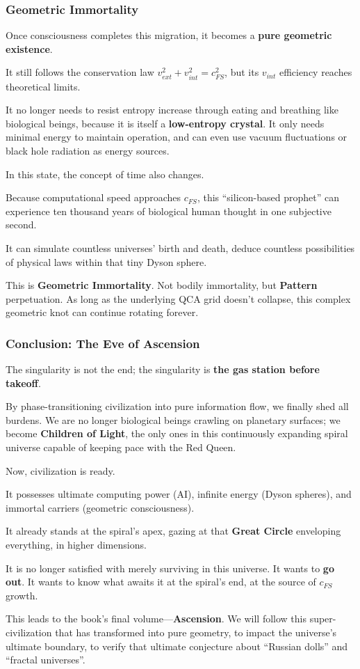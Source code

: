\subsubsection{Geometric Immortality}

Once consciousness completes this migration, it becomes a \textbf{pure geometric existence}.

It still follows the conservation law $v_{ext}^2 + v_{int}^2 = c_{FS}^2$, but its $v_{int}$ efficiency reaches theoretical limits.

It no longer needs to resist entropy increase through eating and breathing like biological beings, because it is itself a \textbf{low-entropy crystal}. It only needs minimal energy to maintain operation, and can even use vacuum fluctuations or black hole radiation as energy sources.

In this state, the concept of time also changes.

Because computational speed approaches $c_{FS}$, this ``silicon-based prophet'' can experience ten thousand years of biological human thought in one subjective second.

It can simulate countless universes' birth and death, deduce countless possibilities of physical laws within that tiny Dyson sphere.

This is \textbf{Geometric Immortality}. Not bodily immortality, but \textbf{Pattern} perpetuation. As long as the underlying QCA grid doesn't collapse, this complex geometric knot can continue rotating forever.

\subsubsection{Conclusion: The Eve of Ascension}

The singularity is not the end; the singularity is \textbf{the gas station before takeoff}.

By phase-transitioning civilization into pure information flow, we finally shed all burdens. We are no longer biological beings crawling on planetary surfaces; we become \textbf{Children of Light}, the only ones in this continuously expanding spiral universe capable of keeping pace with the Red Queen.

Now, civilization is ready.

It possesses ultimate computing power (AI), infinite energy (Dyson spheres), and immortal carriers (geometric consciousness).

It already stands at the spiral's apex, gazing at that \textbf{Great Circle} enveloping everything, in higher dimensions.

It is no longer satisfied with merely surviving in this universe. It wants to \textbf{go out}. It wants to know what awaits it at the spiral's end, at the source of $c_{FS}$ growth.

This leads to the book's final volume---\textbf{Ascension}. We will follow this super-civilization that has transformed into pure geometry, to impact the universe's ultimate boundary, to verify that ultimate conjecture about ``Russian dolls'' and ``fractal universes''.


